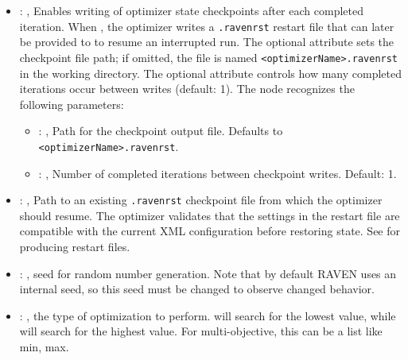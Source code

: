 \begin{itemize}
\begin{itemize}
        \item {}: ,
          Enables writing of optimizer state checkpoints after each completed iteration.
          When , the optimizer writes a \texttt{.ravenrst} restart file that
          can later be provided to  to resume an interrupted run. The
          optional  attribute sets the checkpoint file path; if omitted, the
          file is named \texttt{<optimizerName>.ravenrst} in the working directory. The
          optional  attribute controls how many completed iterations occur
          between writes (default: 1).
          The  node recognizes the following parameters:
            \begin{itemize}
              \item {}: ,
                Path for the checkpoint output file. Defaults to \texttt{<optimizerName>.ravenrst}.
              \item {}: ,
                Number of completed iterations between checkpoint writes. Default: 1.
          \end{itemize}

        \item {}: ,
          Path to an existing \texttt{.ravenrst} checkpoint file from which the optimizer
          should resume. The optimizer validates that the settings in the restart file are
          compatible with the current XML configuration before restoring state. See
           for producing restart files.

        \item {}: ,
          seed for random number generation. Note that by default RAVEN uses an internal seed,
          so this seed must be changed to observe changed behavior. 

        \item {}: ,
          the type of optimization to perform.  will search for the lowest
           value, while  will search for the highest value.
          For multi-objective, this can be a list like min, max.
      \end{itemize}


\end{itemize}
